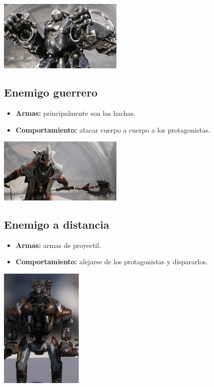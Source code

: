 \documentclass[11pt, twoside]{article}
\begin{document}
\begin{center}
\includegraphics[width=6cm]{./images/shiva.jpg}
\end{center}

\subsection{Enemigo guerrero}
\begin{itemize}
\item \textbf{Armas:} principalmente son las hachas.
\item \textbf{Comportamiento:} atacar cuerpo a cuerpo a los protagonistas.
\end{itemize}

\begin{center}
\includegraphics[width=6cm]{./images/guerrero.jpg}
\end{center}

\subsection{Enemigo a distancia}
\begin{itemize}
\item \textbf{Armas:} armas de proyectil.
\item \textbf{Comportamiento:} alejarse de los protagonistas y dispararlos.
\end{itemize}

\begin{center}
\includegraphics[width=4cm]{./images/distancia.jpg}
\end{center}
\end{document}
